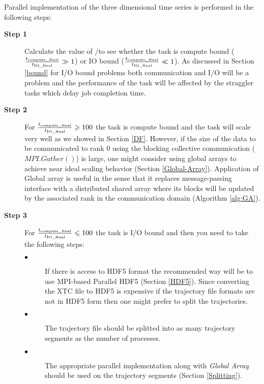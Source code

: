 \label{guideline}
Parallel implementation of the three dimensional time series is performed in the following steps:

\begin{description}
  \item[\textbf{Step 1}] Calculate the value of \tcomp/\tIO to see whether the task is compute bound ($\frac{{t}_{\text{compute\_final}}}{{t}_{\text{IO\_final}}} \gg 1$) or IO bound ($\frac{{t}_{\text{compute\_final}}}{{t}_{\text{IO\_final}}} \ll 1$). As discussed in Section \ref{bound} for I/O bound problems both communication and I/O will be a problem and the performance of the task will be affected by the straggler tasks which delay job completion time.  
  
  \item[\textbf{Step 2}] For $\frac{{t}_{\text{compute\_final}}}{{t}_{\text{IO\_final}}} \geqslant 100$ the task is compute bound and the task will scale very well as we showed in Section \ref{DF}. However, if the size of the data to be communicated to rank 0 using the blocking collective communication ($MPI.Gather()$) is large, one might consider using global arrays to achieve near ideal scaling behavior (Section \ref{Global-Array}). Application of Global array is useful in the sense that it replaces message-passing interface with a distributed shared array where its blocks will be updated by the associated rank in the communication domain (Algorithm \ref{alg:GA}). 
  \item[\textbf{Step 3}] For $\frac{{t}_{\text{compute\_final}}}{{t}_{\text{IO\_final}}} \leqslant 100$ the task is I/O bound and then you need to take the following steps:
   
\begin{description}
  \item[$\bullet$] If there is access to HDF5 format the recommended way will be to use MPI-based Parallel HDF5 (Section \ref{HDF5}). Since converting the XTC file to HDF5 is expensive if the trajectory file formats are not in HDF5 form then one might prefer to split the trajectories. 
  \item[$\bullet$] The trajectory file should be splitted into as many trajectory segments as the number of processes.
  \item[$\bullet$] The appropriate parallel implementation along with \emph{Global Array} should be used on the trajectory segments (Section \ref{Splitting}).
\end{description}
   
\end{description}


